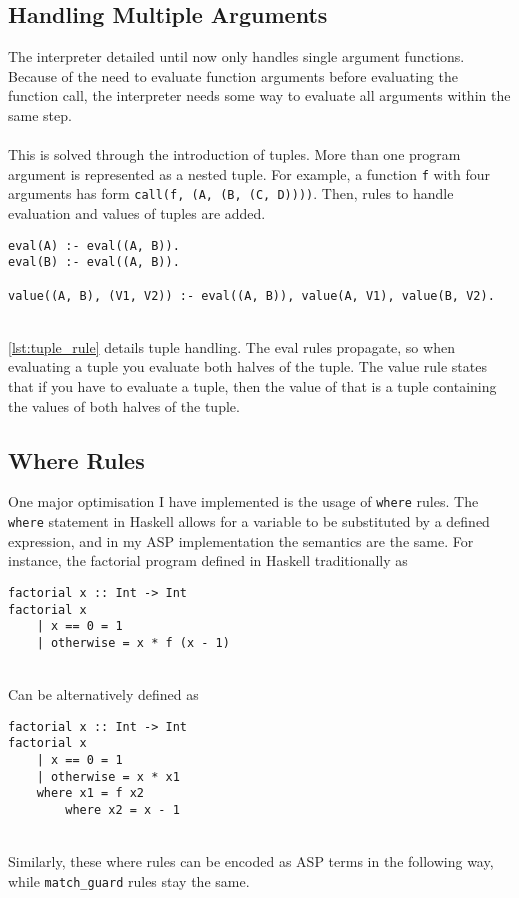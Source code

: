 \subsection{Handling Multiple Arguments}
The interpreter detailed until now only handles single argument functions. Because of the need to evaluate function arguments before evaluating the function call, the interpreter needs some way to evaluate all arguments within the same step. \\ \\
This is solved through the introduction of tuples. More than one program argument is represented as a nested tuple. For example, a function \lstinline!f! with four arguments has form \lstinline!call(f, (A, (B, (C, D))))!. Then, rules to handle evaluation and values of tuples are added. 

\begin{lstlisting}[caption={Tuple rules}, label={lst:tuple_rule}, firstnumber=78]
eval(A) :- eval((A, B)).
eval(B) :- eval((A, B)).

value((A, B), (V1, V2)) :- eval((A, B)), value(A, V1), value(B, V2).
\end{lstlisting}
\mbox{}\\
\ref{lst:tuple_rule} details tuple handling. The eval rules propagate, so when evaluating a tuple you evaluate both halves of the tuple. The value rule states that if you have to evaluate a tuple, then the value of that is a tuple containing the values of both halves of the tuple.

\subsection{Where Rules}
One major optimisation I have implemented is the usage of \lstinline!where! rules. The \lstinline!where! statement in Haskell allows for a variable to be substituted by a defined expression, and in my ASP implementation the semantics are the same. For instance, the factorial program defined in Haskell traditionally as \\

\begin{lstlisting}
factorial x :: Int -> Int
factorial x 
	| x == 0 = 1
	| otherwise = x * f (x - 1)
\end{lstlisting}
\mbox{}\\
Can be alternatively defined as \\

\begin{lstlisting}
factorial x :: Int -> Int
factorial x 
	| x == 0 = 1
	| otherwise = x * x1
	where x1 = f x2
		where x2 = x - 1
\end{lstlisting}
\mbox{}\\
Similarly, these where rules can be encoded as ASP terms in the following way, while \lstinline!match_guard! rules stay the same.\\

